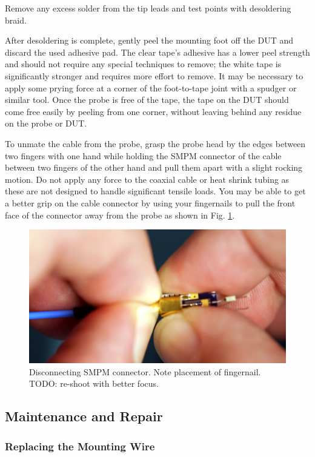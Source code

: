 \documentclass[11pt]{article}
\begin{document}
Remove any excess solder from the tip leads and test points with desoldering braid.

After desoldering is complete, gently peel the mounting foot off the DUT and discard the used adhesive pad. The clear
tape's adhesive has a lower peel strength and should not require any special techniques to remove; the white tape is
significantly stronger and requires more effort to remove. It may be necessary to apply some prying force at a corner
of the foot-to-tape joint with a spudger or similar tool. Once the probe is free of the tape, the tape on the DUT
should come free easily by peeling from one corner, without leaving behind any residue on the probe or DUT.

To unmate the cable from the probe, grasp the probe head by the edges between two fingers with one hand while holding
the SMPM connector of the cable between two fingers of the other hand and pull them apart with a slight rocking motion.
Do not apply any force to the coaxial cable or heat shrink tubing as these are not designed to handle significant
tensile loads. You may be able to get a better grip on the cable connector by using your fingernails to pull the front
face of the connector away from the probe as shown in Fig. \ref{smpm-unmating}.

\begin{figure}[h]
\centering
\includegraphics[width=12cm]{smpm-unmating.jpg}
\caption{Disconnecting SMPM connector. Note placement of fingernail. TODO: re-shoot with better focus.}
\label{smpm-unmating}
\end{figure}
\FloatBarrier

\subsection{Maintenance and Repair}

\subsubsection{Replacing the Mounting Wire}
\end{document}
